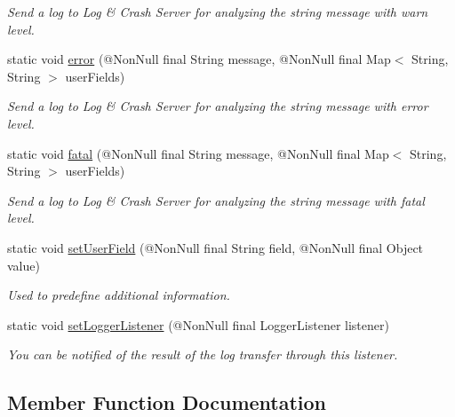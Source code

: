 \begin{DoxyCompactItemize}
\begin{DoxyCompactList}\small\item\em Send a log to Log \& Crash Server for analyzing the string message with warn level. \end{DoxyCompactList}\item 
static void \hyperlink{classcom_1_1toast_1_1android_1_1gamebase_1_1_gamebase_1_1_logger_aee5a963d79bf05d430aa6c79d9055627}{error} (@Non\+Null final String message, @Non\+Null final Map$<$ String, String $>$ user\+Fields)
\begin{DoxyCompactList}\small\item\em Send a log to Log \& Crash Server for analyzing the string message with error level. \end{DoxyCompactList}\item 
static void \hyperlink{classcom_1_1toast_1_1android_1_1gamebase_1_1_gamebase_1_1_logger_ad9c45ca92a20a6a59675f24cb62bcd78}{fatal} (@Non\+Null final String message, @Non\+Null final Map$<$ String, String $>$ user\+Fields)
\begin{DoxyCompactList}\small\item\em Send a log to Log \& Crash Server for analyzing the string message with fatal level. \end{DoxyCompactList}\item 
static void \hyperlink{classcom_1_1toast_1_1android_1_1gamebase_1_1_gamebase_1_1_logger_af3cd86fda0c3708472c158e77716e7f4}{set\+User\+Field} (@Non\+Null final String field, @Non\+Null final Object value)
\begin{DoxyCompactList}\small\item\em Used to predefine additional information. \end{DoxyCompactList}\item 
static void \hyperlink{classcom_1_1toast_1_1android_1_1gamebase_1_1_gamebase_1_1_logger_a356fed9a55f3cdc8701999acc459b9d5}{set\+Logger\+Listener} (@Non\+Null final Logger\+Listener listener)
\begin{DoxyCompactList}\small\item\em You can be notified of the result of the log transfer through this listener. \end{DoxyCompactList}\end{DoxyCompactItemize}


\subsection{Member Function Documentation}
\mbox{\label{classcom_1_1toast_1_1android_1_1gamebase_1_1_gamebase_1_1_logger_a6daac76adb572802174f928a4d181c05}} 
